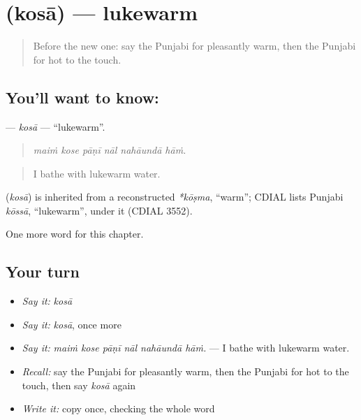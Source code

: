 \section[\texorpdfstring{\pa{ਕੋਸਾ} (kosā)}{ਕੋਸਾ (kosā)}]{ (kosā) — lukewarm}

\label{lesson:PA-C291-kosa}



\begin{quote}
Before the new one: say the Punjabi for pleasantly warm, then the Punjabi for hot to the touch.
\end{quote}

\subsection*{You'll want to know: }
\textbf{} — \emph{kosā} — \textquotedblleft{}lukewarm\textquotedblright{}.

\begin{quote}
     
\end{quote}

\begin{quote}
\emph{maiṁ kose pāṇī nāl nahāundā hāṁ.}
\end{quote}

\begin{quote}
I bathe with lukewarm water.
\end{quote}

\begin{cousinweb}
\textbf{} (\emph{kosā}) is inherited from a reconstructed \emph{*kōṣma}, \textquotedblleft{}warm\textquotedblright{}; CDIAL lists Punjabi \emph{kōssā}, \textquotedblleft{}lukewarm\textquotedblright{}, under it (CDIAL 3552).
\end{cousinweb}

\begin{grammarlens}[title={What you've built}]
One more word for this chapter.
\end{grammarlens}

\subsection*{Your turn}
\begin{itemize}
\raggedright
  \item \emph{Say it:} \emph{kosā}
  \item \emph{Say it:} \emph{kosā}, once more
  \item \emph{Say it:} \emph{maiṁ kose pāṇī nāl nahāundā hāṁ.} — I bathe with lukewarm water.
  \item \emph{Recall:} say the Punjabi for pleasantly warm, then the Punjabi for hot to the touch, then say \emph{kosā} again
  \item \emph{Write it:} copy \textbf{} once, checking the whole word
\end{itemize}

